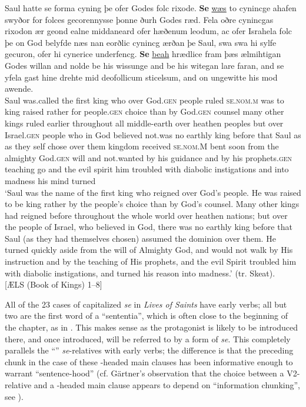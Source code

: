 \documentclass[output=paper,colorlinks,citecolor=brown]{langscibook}
\begin{document}
\ea\label{ex:los:27}
\gll Saul hatte se forma cyning þe ofer Godes folc rixode. \textbf{Se} \underline{wæs} to cynincge ahafen swyðor for folces gecorennysse þonne ðurh Godes ræd. Fela oðre cynincgas rixodon ær geond ealne middaneard ofer hæðenum leodum, ac ofer Israhela folc þe on God belyfde næs nan eorðlic cynincg ærðan þe Saul, swa swa hi sylfe gecuron, ofer hi cynerice underfencg. \textbf{Se} \underline{beah} hrædlice fram þæs ælmihtigan Godes willan and nolde be his wissunge and be his witegan lare faran, and se yfela gast hine drehte mid deofollicum sticelsum, and on ungewitte his mod awende.\\
Saul was.called the first king who over God.\textsc{gen} people ruled \textsc{se.nom.m} was to king raised rather for people.\textsc{gen} choice than by God.\textsc{gen} counsel many other kings ruled earlier throughout all middle-earth over heathen peoples but over Israel.\textsc{gen} people who in God believed not.was no earthly king before that Saul as as they self chose over them kingdom received \textsc{se.nom.M} bent soon from the almighty God.\textsc{gen} will and not.wanted by his guidance and by his prophets.\textsc{gen} teaching go and the evil spirit him troubled with diabolic instigations and into madness his mind turned\\
\glt ‘Saul was the name of the first king who reigned over God's people. He was raised to be king rather by the people's choice than by God's counsel. Many other kings had reigned before throughout the whole world over heathen nations; but over the people of Israel, who believed in God, there was no earthly king before that Saul (as they had themselves chosen) assumed the dominion over them. He turned quickly aside from the will of Almighty God, and would not walk by His instruction and by the teaching of His prophets, and the evil Spirit troubled him with diabolic instigations, and turned his reason into madness.' (tr. Skeat).\\ \hfill [ÆLS (Book of Kings) 1--8]
\z

All of the 23 cases of capitalized \textit{se} in \textit{Lives of Saints} have early verbs; all but two are the first word of a “sententia”, which is often close to the beginning of the chapter, as in . This makes sense as the protagonist is likely to be introduced there, and once introduced, will be referred to by a form of \textit{se}. This completely parallels the “” \textit{se}{}-relatives with early verbs; the difference is that the preceding chunk in the case of these -headed main clauses has been informative enough to warrant “sentence-hood” (cf. Gärtner's observation that the choice between a V2-relative and a -headed main clause appears to depend on “information chunking”, see ). 
\end{document}
